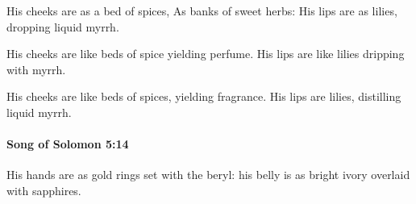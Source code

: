 			\begin{versebox}
					\item[BHS] 
					\item[LXX] 
					\item[ASV] His cheeks are as a bed of spices, As banks of sweet herbs: His lips are as lilies, dropping liquid myrrh.
					\item[NIV] His cheeks are like beds of spice yielding perfume. His lips are like lilies dripping with myrrh.
					\item[NRSV] His cheeks are like beds of spices, yielding fragrance. His lips are lilies, distilling liquid myrrh.
			\end{versebox}

		\paragraph{Song of Solomon 5:14} %
			\label{SONGOFSOLOMON-5-14}

			His hands are as gold rings set with the beryl: his belly is as bright ivory overlaid with sapphires.

